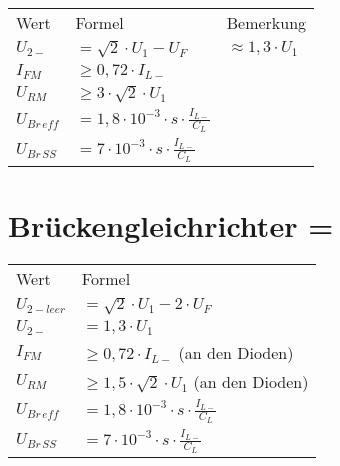    \begin{table}[H]
        \begin{tabularx}{\columnwidth}{l l l}
            Wert            & Formel                                             & Bemerkung \\
            $U_{2-}$        & $=\sqrt{2}\cdot U_1-U_F$                           & $\approx 1,3\cdot U_1 $ \\
            $I_{FM}$        & $\geq 0,72\cdot I_{L-}$                            & \\
            $U_{RM}$        & $\geq 3\cdot \sqrt{2}\cdot U_1$                    & \\
            $U_{Br\, eff}$  & $=1,8\cdot 10^{-3}\cdot s\cdot\frac{I_{L-}}{C_L}$  & \\
            $U_{Br\, SS}$   & $=7\cdot 10^{-3}\cdot s\cdot\frac{I_{L-}}{C_L}$    & \\
        \end{tabularx}
    \end{table}

\section{Brückengleichrichter = }\label{sec:bruckengleichrichter}
    \begin{minipage}{0.5\columnwidth}
        \begin{table}[H]
            \begin{tabularx}{\columnwidth}{l l}
                Wert            & Formel \\
                $U_{2-leer}$    & $=\sqrt{2}\cdot U_1-2\cdot U_F$ \\
                $U_{2-}$        & $=1,3\cdot U_1$ \\
                $I_{FM}$        & $\geq 0,72\cdot I_{L-}$ (an den Dioden) \\
                $U_{RM}$        & $\geq 1,5\cdot\sqrt{2}\cdot U_1$ (an den Dioden) \\
                $U_{Br\,eff}$   & $=1,8\cdot 10^{-3}\cdot s \cdot\frac{I_{L-}}{C_L}$ \\
                $U_{Br\,SS}$    & $=7\cdot 10^{-3}\cdot s \cdot\frac{I_{L-}}{C_L}$ \\
            \end{tabularx}
        \end{table}
    \end{minipage}
    \begin{minipage}{0.5\columnwidth}
    \end{minipage}


